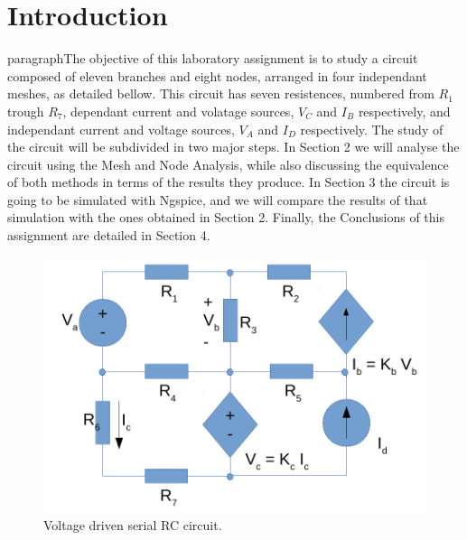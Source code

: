 \section{Introduction}
\label{sec:introduction}

paragraph{}The objective of this laboratory assignment is to study a circuit composed of eleven branches and eight nodes, arranged in four independant meshes,
 as detailed bellow. This circuit has seven resistences, numbered from $R_1$ trough $R_7$, dependant current and volatage sources, $V_C$ and $I_B$ respectively,
 and independant current and voltage sources, $V_A$ and $I_D$ respectively.
The study of the circuit will be subdivided in two major steps. In Section 2 we will analyse the circuit using the Mesh and Node Analysis,
while also discussing the equivalence of both methods in terms of the results they produce. In Section 3 the circuit is going to be simulated
 with Ngspice, and we will compare the results of that simulation with the ones obtained in Section 2.
Finally, the Conclusions of this assignment are detailed in Section 4.

\begin{figure}[h] \centering
\includegraphics[width=0.4\linewidth]{circuit.pdf}
\caption{Voltage driven serial RC circuit.}
\label{fig:rc}
\end{figure}



